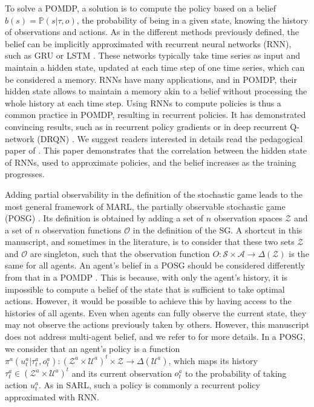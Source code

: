 To solve a POMDP, a solution is to compute the policy based on a belief $b(s)=\mathbb{P}(s|\tau,o)$, the probability of being in a given state, knowing the history of observations and actions.
As in the different methods previously defined, the belief can be implicitly approximated with recurrent neural networks (RNN), such as GRU \citep{Chung2014EmpiricalModeling} or LSTM \citep{Hochreiter1997LongMemory}.
These networks typically take time series as input and maintain a hidden state, updated at each time step of one time series, which can be considered a memory.
RNNs have many applications, and in POMDP, their hidden state allows to maintain a memory akin to a belief without processing the whole history at each time step.
Using RNNs to compute policies is thus a common practice in POMDP, resulting in recurrent policies.
It has demonstrated convincing results, such as in recurrent policy gradients \citep{wierstra2010recurrent} or in deep recurrent Q-network (DRQN) \citep{Hausknecht2015DeepMDPs}.
We suggest readers interested in details read the pedagogical paper of \cite{lambrechts2022recurrent}.
This paper demonstrates that the correlation between the hidden state of RNNs, used to approximate policies, and the belief increases as the training progresses.

Adding partial observability in the definition of the stochastic game leads to the most general framework of MARL, the partially observable stochastic game (POSG) \citep{hansen2004dynamic}.
Its definition is obtained by adding a set of $n$ observation spaces $\mathcal{Z}$ and a set of $n$ observation functions $\mathcal{O}$ in the definition of the SG.
A shortcut in this manuscript, and sometimes in the literature, is to consider that these two sets $\mathcal{Z}$ and $\mathcal{O}$ are singleton, such that the observation function $O:\mathcal{S} \times \mathcal{A} \rightarrow \Delta(\mathcal{Z})$ is the same for all agents.
An agent's belief in a POSG should be considered differently from that in a POMDP \citep{DecPomdp}.
This is because, with only the agent's history, it is impossible to compute a belief of the state that is sufficient to take optimal actions.
However, it would be possible to achieve this by having access to the histories of all agents.
Even when agents can fully observe the current state, they may not observe the actions previously taken by others.
However, this manuscript does not address multi-agent belief, and we refer to \citep{DecPomdp} for more details.
In a POSG, we consider that an agent's policy is a function $\pi^{a}(u_t^{a}|\tau_t^{a},o_t^{a}): (\mathcal{Z}^a \times \mathcal{U}^a)^t \times \mathcal{Z} \rightarrow \Delta(\mathcal{U}^a)$, which maps its history $\tau_t^{a} \in (\mathcal{Z}^a \times \mathcal{U}^a)^{t}$ and its current observation $o_t^{a}$ to the probability of taking action $u_t^{a}$.
As in SARL, such a policy is commonly a recurrent policy approximated with RNN.
